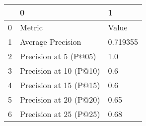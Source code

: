 \begin{tabular}{lll}
\toprule
{} &                       0 &         1 \\
\midrule
0 &                  Metric &     Value \\
1 &       Average Precision &  0.719355 \\
2 &   Precision at 5 (P@05) &       1.0 \\
3 &  Precision at 10 (P@10) &       0.6 \\
4 &  Precision at 15 (P@15) &       0.6 \\
5 &  Precision at 20 (P@20) &      0.65 \\
6 &  Precision at 25 (P@25) &      0.68 \\
\bottomrule
\end{tabular}
